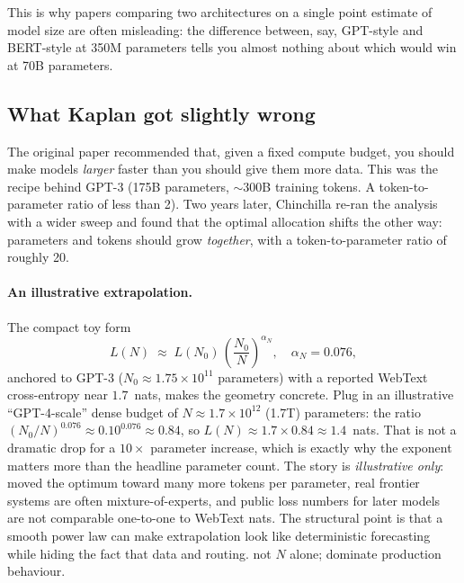 This is why papers comparing two architectures on a single point estimate
of model size are often misleading: the difference between, say, GPT-style
and BERT-style at 350M parameters tells you almost nothing about which would
win at 70B parameters.

\subsection{What Kaplan got slightly wrong}

The original paper recommended that, given a fixed compute budget, you
should make models \emph{larger} faster than you should give them more data.
This was the recipe behind GPT-3 (175B parameters, ${\sim}300$B training
tokens. A token-to-parameter ratio of less than 2). Two years later,
Chinchilla \citep{hoffmann2022training} re-ran the analysis with a wider
sweep and found that the optimal allocation shifts the other way:
parameters and tokens should grow \emph{together}, with a token-to-parameter
ratio of roughly 20.

\paragraph{An illustrative extrapolation.}
The compact toy form
\begin{equation}
  L(N) \;\approx\; L(N_{0})\,\left(\frac{N_{0}}{N}\right)^{\alpha_{N}},
  \quad \alpha_{N} = 0.076,
\end{equation}
anchored to GPT-3 (\(N_{0} \approx 1.75\times 10^{11}\) parameters) with a reported
WebText cross-entropy near \(1.7\)~nats,
makes the geometry concrete. Plug in an illustrative ``GPT-4-scale'' dense
budget of \(N \approx 1.7\times 10^{12}\) (1.7T) parameters: the ratio
\((N_{0}/N)^{0.076} \approx 0.10^{0.076} \approx 0.84\), so
\(L(N) \approx 1.7 \times 0.84 \approx 1.4\)~nats. That is not a dramatic drop
for a \(10\times\) parameter increase, which is exactly why the exponent
matters more than the headline parameter count. The story is \emph{illustrative
only}: \citet{hoffmann2022training} moved the optimum toward many more tokens
per parameter, real frontier systems are often mixture-of-experts, and public
loss numbers for later models are not comparable one-to-one to WebText nats.
The structural point is that a smooth power law can make extrapolation look
like deterministic forecasting while hiding the fact that data and routing.
not \(N\) alone; dominate production behaviour.

